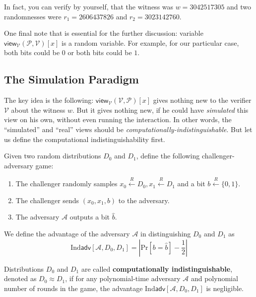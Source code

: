 \documentclass[../lecture-notes.tex]{subfiles}
\begin{document}
\begin{example}
    In fact, you can verify by yourself, that the witness was $w = 3042517305$ and two randomnesses were $r_1 = 2606437826$ and $r_2 = 3023142760$.

    One final note that is essential for the further discussion: variable $\mathsf{view}_{\mathcal{V}}(\mathcal{P}, \mathcal{V})[x]$ is a random variable. For example, for our particular case, both bits could be $0$ or both bits could be $1$. 
\end{example}

\subsection{The Simulation Paradigm}

The key idea is the following: $\mathsf{view}_{\mathcal{V}}(\mathcal{V}, \mathcal{P})[x]$ gives nothing new to the verifier $\mathcal{V}$ about the witness $w$. But it gives nothing new, if he could have \textit{simulated} this view on his own, without even running the interaction. In other words, the ``simulated'' and ``real'' views should be \textit{computationally-indistinguishable}. But let us define the computational indistinguishability first.

\begin{definition}
    Given two random distributions $D_0$ and $D_1$, define the following challenger-adversary game:
    \begin{enumerate}
        \item The challenger randomly samples $x_0 \xleftarrow{R} D_0, x_1 \xleftarrow{R} D_1$ and a bit $b \xleftarrow{R} \{0,1\}$.
        \item The challenger sends $(x_0, x_1, b)$ to the adversary.
        \item The adversary $\mathcal{A}$ outputs a bit $\hat{b}$.
    \end{enumerate}

    We define the advantage of the adversary $\mathcal{A}$ in distinguishing $D_0$ and $D_1$ as 
    \begin{equation*}
        \text{Ind}\textsf{adv}[\mathcal{A}, D_0, D_1] = \left|\text{Pr}[b = \hat{b}] - \frac{1}{2}\right|
    \end{equation*}

    Distributions $D_0$ and $D_1$ are called \textbf{computationally indistinguishable}, denoted as $D_0 \approx D_1$, if for any polynomial-time adversary $\mathcal{A}$ and polynomial number of rounds in the game, the advantage $\text{Ind}\textsf{adv}[\mathcal{A}, D_0, D_1]$ is negligible.
\end{definition}
\end{document}
